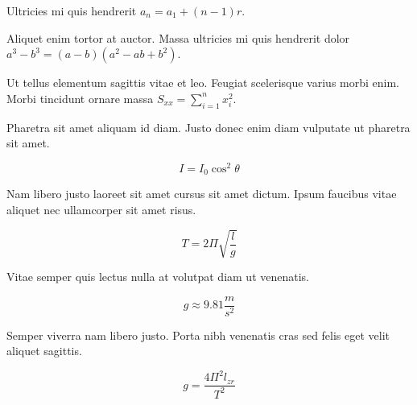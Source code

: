 \documentclass{article}
\begin{document}
Ultricies mi quis hendrerit \begin{math}
a_n=a_1+(n-1)r
\end{math}.\newline

Aliquet enim tortor at auctor. Massa ultricies mi quis hendrerit dolor $ a^3-b^3=(a-b)(a^2-ab+b^2) $.\newline

Ut tellus elementum sagittis vitae et leo. Feugiat scelerisque varius morbi enim. Morbi tincidunt ornare massa \( S_{xx}=\sum_{i=1}^{n}x_i^2 \).\newline

Pharetra sit amet aliquam id diam. Justo donec enim diam vulputate ut pharetra sit amet.

\[ I=I_0\cos ^2\theta \]

Nam libero justo laoreet sit amet cursus sit amet dictum. Ipsum faucibus vitae aliquet nec ullamcorper sit amet risus.

$$ T=2\Pi \sqrt{\frac{l}{g}} $$

Vitae semper quis lectus nulla at volutpat diam ut venenatis.

\begin{displaymath}
	g\approx 9.81\frac{m}{s^2}
\end{displaymath}

Semper viverra nam libero justo. Porta nibh venenatis cras sed felis eget velit aliquet sagittis.

\begin{equation}
	g=\frac{4\Pi^2l_{zr}}{T^2}
\end{equation}
\end{document}
